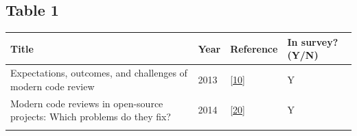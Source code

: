 \documentclass[]{book}
\begin{document}
\subsection{Table 1}\label{table-1}

\begin{longtable}[]{@{}llll@{}}
\toprule
\begin{minipage}[b]{0.63\columnwidth}\raggedright\strut
Title\strut
\end{minipage} & \begin{minipage}[b]{0.03\columnwidth}\raggedright\strut
Year\strut
\end{minipage} & \begin{minipage}[b]{0.14\columnwidth}\raggedright\strut
Reference\strut
\end{minipage} & \begin{minipage}[b]{0.09\columnwidth}\raggedright\strut
In survey? (Y/N)\strut
\end{minipage}\tabularnewline
\midrule
\endhead
\begin{minipage}[t]{0.63\columnwidth}\raggedright\strut
Expectations, outcomes, and challenges of modern code review\strut
\end{minipage} & \begin{minipage}[t]{0.03\columnwidth}\raggedright\strut
2013\strut
\end{minipage} & \begin{minipage}[t]{0.14\columnwidth}\raggedright\strut
{[}\protect\hyperlink{ref-bacchelli2013expectations}{10}{]}\strut
\end{minipage} & \begin{minipage}[t]{0.09\columnwidth}\raggedright\strut
Y\strut
\end{minipage}\tabularnewline
\begin{minipage}[t]{0.63\columnwidth}\raggedright\strut
Modern code reviews in open-source projects: Which problems do they
fix?\strut
\end{minipage} & \begin{minipage}[t]{0.03\columnwidth}\raggedright\strut
2014\strut
\end{minipage} & \begin{minipage}[t]{0.14\columnwidth}\raggedright\strut
{[}\protect\hyperlink{ref-beller2014modern}{20}{]}\strut
\end{minipage} & \begin{minipage}[t]{0.09\columnwidth}\raggedright\strut
Y\strut
\end{minipage}\tabularnewline
\begin{minipage}[t]{0.63\columnwidth}\raggedright\strut

\end{minipage}
\end{longtable}
\end{document}

